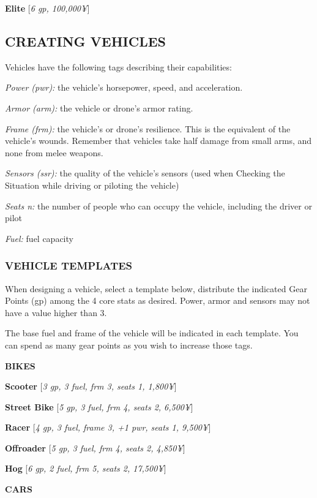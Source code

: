 \documentclass[oneside,10pt]{article}
\begin{document}
\begin{multicols}{2}
\textbf{Elite} [\textit{6 gp, 100,000¥}]

\subsection{CREATING VEHICLES}
Vehicles have the following tags describing their capabilities:

\begin{adjustwidth*}{.5cm}{.5cm}

\textit{Power (pwr):} the vehicle’s horsepower, speed, and acceleration.

\textit{Armor (arm):} the vehicle or drone’s armor rating.

\textit{Frame (frm):} the vehicle’s or drone’s resilience. This is the
equivalent of the vehicle’s wounds. Remember that vehicles take half damage from small arms, and none from
melee weapons.

\textit{Sensors (ssr):} the quality of the vehicle’s sensors (used
when Checking the Situation while driving or piloting the
vehicle)

\textit{Seats n:} the number of people who can occupy the vehicle,
including the driver or pilot

\textit{Fuel:} fuel capacity
\end{adjustwidth*}

\subsubsection{VEHICLE TEMPLATES}
When designing a vehicle, select a template below, distribute
the indicated Gear Points (gp) among the 4 core stats as desired. Power, armor and sensors may not have a value higher
than 3.

The base fuel and frame of the vehicle will be indicated in
each template. You can spend as many gear points as you
wish to increase those tags.

\textbf{BIKES}

\textbf{Scooter} [\textit{3 gp, 3 fuel, frm 3, seats 1, 1,800¥}]

\textbf{Street Bike} [\textit{5 gp, 3 fuel, frm 4, seats 2, 6,500¥}]

\textbf{Racer} [\textit{4 gp, 3 fuel, frame 3, +1 pwr, seats 1, 9,500¥}]

\textbf{Offroader} [\textit{5 gp, 3 fuel, frm 4, seats 2, 4,850¥}]

\textbf{Hog} [\textit{6 gp, 2 fuel, frm 5, seats 2, 17,500¥}]

\textbf{CARS}


\end{multicols}
\end{document}
